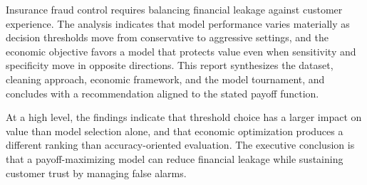 Insurance fraud control requires balancing financial leakage against customer experience. The analysis indicates that model performance varies materially as decision thresholds move from conservative to aggressive settings, and the economic objective favors a model that protects value even when sensitivity and specificity move in opposite directions. This report synthesizes the dataset, cleaning approach, economic framework, and the model tournament, and concludes with a recommendation aligned to the stated payoff function.

At a high level, the findings indicate that threshold choice has a larger impact on value than model selection alone, and that economic optimization produces a different ranking than accuracy-oriented evaluation. The executive conclusion is that a payoff-maximizing model can reduce financial leakage while sustaining customer trust by managing false alarms.
